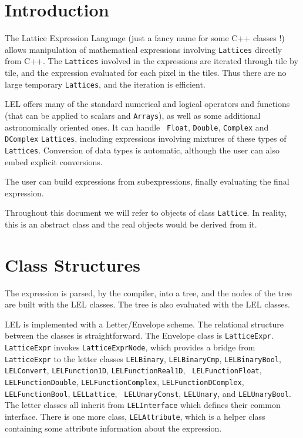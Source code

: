\section{Introduction}

The Lattice Expression Language (just a fancy name for some C++ classes !)
allows manipulation of mathematical expressions involving {\tt Lattices}
directly from C++.  The {\tt Lattices} involved in the expressions are
iterated through tile by tile, and the expression evaluated for each
pixel in the tiles.  Thus there are no large temporary {\tt Lattices}, and the
iteration is efficient.   

LEL offers many of the standard numerical and logical operators and
functions (that can be applied to scalars and {\tt Arrays}), as well as
some additional astronomically oriented ones.  It can handle {\tt
Float}, {\tt Double}, {\tt Complex} and {\tt DComplex} {\tt Lattices},
including expressions involving mixtures of these types of {\tt
Lattices}.  Conversion of data types is automatic, although the user can
also embed explicit conversions. 

The user can build expressions from subexpressions, finally evaluating
the final expression.  

Throughout this document we will refer to objects of class
{\tt Lattice}.  In reality, this is an abstract class and
the real objects would be derived from it.

\section {Class Structures}

The expression is parsed, by the compiler, into a tree, and the nodes of
the tree are built with the LEL classes.  The tree is also evaluated
with the LEL classes. 

LEL is implemented with a Letter/Envelope scheme.  The relational
structure between the classes is straightforward.  The Envelope class is
{\tt LatticeExpr}.  {\tt LatticeExpr} invokes {\tt LatticeExprNode},
which provides a bridge from {\tt LatticeExpr} to the letter classes
{\tt LELBinary}, {\tt LELBinaryCmp}, {\tt LELBinaryBool}, {\tt
LELConvert}, {\tt LELFunction1D}, {\tt LELFunctionReal1D}, {\tt
LELFunctionFloat}, {\tt LELFunctionDouble}, {\tt LELFunctionComplex},
{\tt LELFunctionDComplex}, {\tt LELFunctionBool}, {\tt LELLattice}, {\tt
LELUnaryConst}, {\tt LELUnary}, and {\tt LELUnaryBool}.  The letter
classes all inherit from {\tt LELInterface} which defines their common
interface.  There is one more class, {\tt LELAttribute}, which is a
helper class containing some attribute information about the expression. 
 
